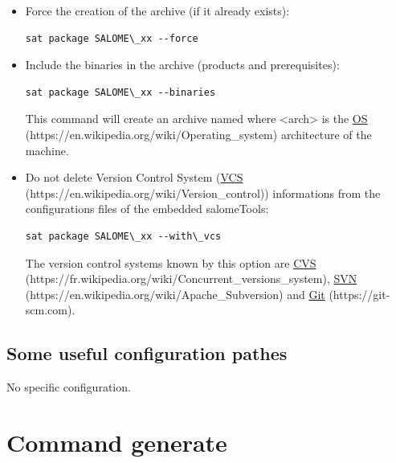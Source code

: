 \documentclass[a4paper,10pt,english]{sphinxmanual}
\begin{document}
\begin{itemize}
\item {} 
Force the creation of the archive (if it already exists):

\begin{Verbatim}[commandchars=\\\{\}]
sat package SALOME\_xx --force
\end{Verbatim}

\item {} 
Include the binaries in the archive (products and prerequisites):

\begin{Verbatim}[commandchars=\\\{\}]
sat package SALOME\_xx --binaries
\end{Verbatim}

This command will create an archive named 
where \textless{}arch\textgreater{} is the \href{https://en.wikipedia.org/wiki/Operating\_system}{OS} (https://en.wikipedia.org/wiki/Operating\_system) architecture of the machine.

\item {} 
Do not delete Version Control System (\href{https://en.wikipedia.org/wiki/Version\_control}{VCS} (https://en.wikipedia.org/wiki/Version\_control)) informations from the configurations files of the embedded salomeTools:

\begin{Verbatim}[commandchars=\\\{\}]
sat package SALOME\_xx --with\_vcs
\end{Verbatim}

The version control systems known by this option are \href{https://fr.wikipedia.org/wiki/Concurrent\_versions\_system}{CVS} (https://fr.wikipedia.org/wiki/Concurrent\_versions\_system), \href{https://en.wikipedia.org/wiki/Apache\_Subversion}{SVN} (https://en.wikipedia.org/wiki/Apache\_Subversion) and \href{https://git-scm.com}{Git} (https://git-scm.com).

\end{itemize}


\subsection{Some useful configuration pathes}
\label{commands/package:some-useful-configuration-pathes}
No specific configuration.


\section{Command generate}
\label{commands/generate:svn}\label{commands/generate:command-generate}\label{commands/generate::doc}
\end{document}
